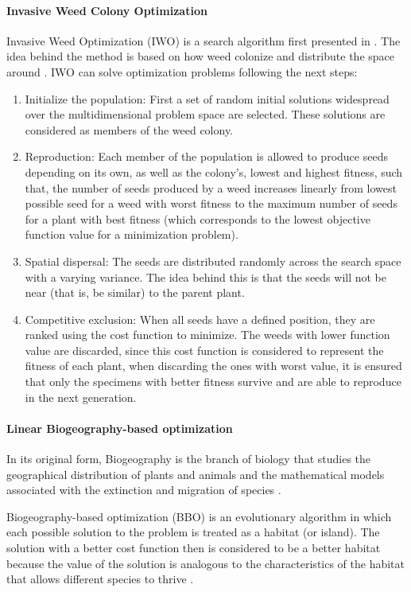 \paragraph{Invasive Weed Colony Optimization}
\label{sec:IWO}
%
Invasive Weed Optimization (IWO) is a search algorithm first presented in \citet{Mehrabian2006a}. The idea behind the method is based on how weed colonize and distribute the space around \citep{Binitha2012}. IWO can solve optimization problems following the next steps:
%
\begin{enumerate}
	\item Initialize the population: First a set of random initial solutions widespread over the multidimensional problem space are selected. These solutions are considered as members of the weed colony. %
	\item Reproduction: Each member of the population is allowed to produce seeds depending on its own, as well as the colony's, lowest and highest fitness, such that, the number of seeds produced by a weed increases linearly from lowest possible seed for a weed with worst fitness to the maximum number of seeds for a plant with best fitness (which corresponds to the lowest objective function value for a minimization problem)\citep{Kundu2011}.%
	\item Spatial dispersal: The seeds are distributed randomly across the search space with a varying variance. The idea behind this is that the seeds will not be near (that is, be similar) to the parent plant.
	\item Competitive exclusion: When all seeds have a defined position, they are ranked using the cost function to minimize. The weeds with lower function value are discarded, since this cost function is considered to represent the fitness of each plant, when discarding the ones with worst value, it is ensured that only the specimens with better fitness survive and are able to reproduce in the next generation.
\end{enumerate}
%
\paragraph{Linear Biogeography-based optimization}
In its original form, Biogeography is the branch of biology that studies the geographical distribution of plants and animals and the mathematical models associated with the extinction and migration of species \citep{MacArthur1967}.

Biogeography-based optimization (BBO) is an evolutionary algorithm in which each possible solution to the problem is treated as a habitat (or island). The solution with a better cost function then is considered to be a better habitat  because the value of the solution is analogous to the characteristics of the habitat that allows different species to thrive \citep{Simon2008}.

